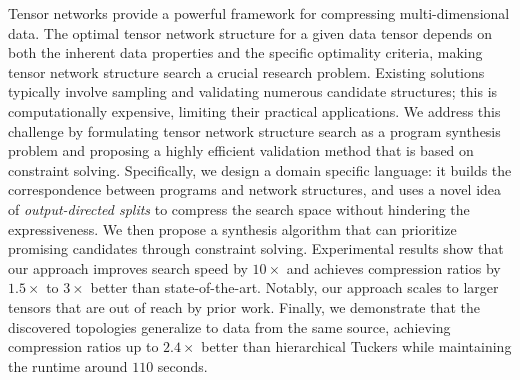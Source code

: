 Tensor networks provide a powerful framework for compressing multi-dimensional data. 
%
The optimal tensor network structure for a given data tensor depends on both the inherent data properties and the specific optimality criteria, making tensor network structure search a crucial research problem.
%
Existing solutions typically involve sampling and validating numerous candidate structures; this is computationally expensive, limiting their practical applications.
%
We address this challenge by formulating tensor network structure search as a program synthesis problem and proposing a highly efficient validation method that is based on constraint solving. 
%
Specifically, we design a domain specific language: it builds the correspondence between programs and network structures, and uses a novel idea of \emph{output-directed splits} to compress the search space without hindering the expressiveness. 
We then propose a synthesis algorithm that can prioritize  promising candidates through constraint solving. 
%
%
Experimental results show that our approach improves search speed by $10\times$ and achieves compression ratios by $1.5\times$ to $3\times$ better than state-of-the-art.
%
Notably, our approach scales to larger tensors that are out of reach by prior work. 
Finally, we demonstrate that the discovered topologies generalize to data from the same source, achieving compression ratios up to $ 2.4\times$ better than hierarchical Tuckers while maintaining the runtime around $110$ seconds.